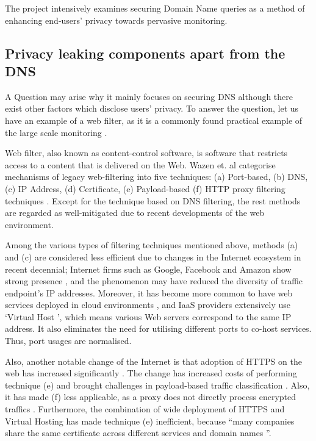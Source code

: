 The project intensively examines securing Domain Name queries as a method of enhancing end-users' privacy towards pervasive monitoring.

\subsection{Privacy leaking components apart from the DNS}
A Question may arise why it mainly focuses on securing DNS although there exist other factors which disclose users' privacy.
To answer the question, let us have an example of a web filter, as it is a commonly found practical example of the large scale monitoring \cite{murdoch2008tools}.

Web filter, also known as content-control software, is software that restricts access to a content that is delivered on the Web.
Wazen et. al categorise mechanisms of legacy web-filtering into five techniques: (a) Port-based, (b) DNS, (c) IP Address, (d) Certificate, (e) Payload-based (f) HTTP proxy filtering techniques \cite{shbair2015efficiently}.
Except for the technique based on DNS filtering, the rest methods are regarded as well-mitigated due to recent developments of the web environment. 

Among the various types of filtering techniques mentioned above, methods (a) and (c) are considered less efficient due to changes in the Internet ecosystem in recent decennial;
Internet firms such as Google, Facebook and Amazon show strong presence \cite{haucap2014google}, and the phenomenon may have reduced the diversity of traffic endpoint's IP addresses.
Moreover, it has become more common to have web services deployed in cloud environments \cite{clouds2018stat}, and IaaS providers extensively use `Virtual Host \cite{virtual24host}', which means various Web servers correspond to the same IP address.
It also eliminates the need for utilising different ports to co-host services. Thus, port usages are normalised.

Also, another notable change of the Internet is that adoption of HTTPS on the web has increased significantly \cite{felt2017measuring}.
The change has increased costs of performing technique (e) and brought challenges in payload-based traffic classification \cite{xue2013traffic}.
Also, it has made (f) less applicable, as a proxy does not directly process encrypted traffics \cite{shbair2015efficiently}.
Furthermore, the combination of wide deployment of HTTPS and Virtual Hosting has made technique (e) inefficient, because ``many companies share the same certificate across different services and domain names \cite{shbair2015efficiently}''.

